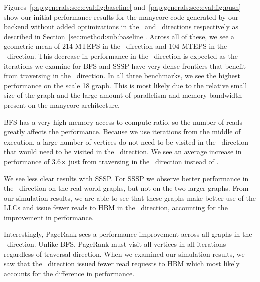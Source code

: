 Figures~\ref{pap:generals:sec:eval:fig:baseline} and~\ref{pap:generals:sec:eval:fig:push} show our initial performance results for the manycore code generated by our backend without added optimizations in the \pull~and \push~directions respectively as described in Section~\ref{sec:method:sub:baseline}.
Across all of these, we see a geometric mean of 214 MTEPS in the \pull~direction and 104 MTEPS in the \push~direction. 
This decrease in performance in the \push~direction is expected as the iterations we examine for BFS and SSSP have very dense frontiers that benefit from traversing in the \pull~direction.
In all three benchmarks, we see the highest performance on the \kron scale 18 graph.
This is most likely due to the relative small size of the graph and the large amount of parallelism and memory bandwidth present on the manycore architecture.
 
BFS has a very high memory access to compute ratio, so the number of reads greatly affects the performance.
Because we use iterations from the middle of execution, a large number of vertices do not need to be visited in the \pull~direction that would need to be visited in the \push~direction. %
We see an average increase in performance of 3.6$\times$ just from traversing in the \pull~direction instead of \push. 
 
We see less clear results with SSSP.
For SSSP we observe better performance in the \pull~direction on the real world graphs, but not on the two larger \kron graphs.
From our simulation results, we are able to see that these \kron graphs make better use of the LLCs and issue fewer reads to HBM in the \push~direction, accounting for the improvement in performance. 
 
Interestingly, PageRank sees a performance improvement across all graphs in the \pull~direction.
Unlike BFS, PageRank must visit all vertices in all iterations regardless of traversal direction.
When we examined our simulation results, we saw that the \pull~direction issued fewer read requests to HBM which most likely accounts for the difference in performance. 
 
  

